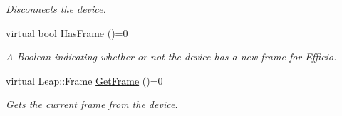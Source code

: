 \begin{DoxyCompactItemize}
\begin{DoxyCompactList}\small\item\em Disconnects the device. \end{DoxyCompactList}\item 
virtual bool \hyperlink{class_efficio_1_1_device_a43eda953d99df9ee4df66df44c205773}{Has\+Frame} ()=0\hypertarget{class_efficio_1_1_device_a43eda953d99df9ee4df66df44c205773}{}\label{class_efficio_1_1_device_a43eda953d99df9ee4df66df44c205773}

\begin{DoxyCompactList}\small\item\em A Boolean indicating whether or not the device has a new frame for Efficio. \end{DoxyCompactList}\item 
virtual Leap\+::\+Frame \hyperlink{class_efficio_1_1_device_a82a46c74f3f75c9b2b08edbe6d2b5477}{Get\+Frame} ()=0\hypertarget{class_efficio_1_1_device_a82a46c74f3f75c9b2b08edbe6d2b5477}{}\label{class_efficio_1_1_device_a82a46c74f3f75c9b2b08edbe6d2b5477}

\begin{DoxyCompactList}\small\item\em Gets the current frame from the device. \end{DoxyCompactList}\end{DoxyCompactItemize}
